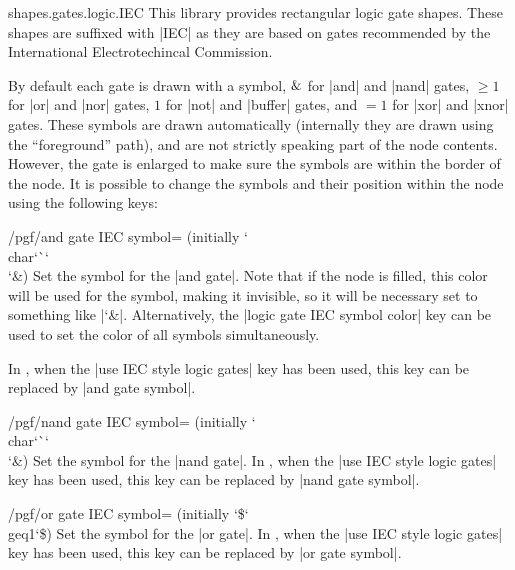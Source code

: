 \begin{pgflibrary}{shapes.gates.logic.IEC}
  This library provides rectangular logic gate shapes. These shapes
  are suffixed with |IEC| as they are based on gates recommended by
  the International Electrotechincal Commission.

  By default each gate is drawn with a symbol, $\char`\&$ for |and| and 
  |nand| gates, $\geq1$ for |or| and |nor| gates, $1$ for |not| and 
  |buffer| gates, and $=1$ for |xor| and |xnor| gates. These symbols 
  are drawn automatically (internally they are drawn using the 
  ``foreground'' path), and are not strictly speaking part of the node
  contents. However, the gate is enlarged to make sure the symbols are 
  within the border of the node.
  It is possible to change
  the symbols and their position within the node using the following
  keys:
  
\begin{key}{/pgf/and gate IEC symbol= (initially \char`\\char\char`\`\char`\\\char`\&)}
  Set the symbol for the |and gate|. Note that if the node is filled,
  this color will be used for the symbol, making it invisible, so
  it will be necessary set  to something like
  |\color{black}\char`\&|. Alternatively, the 
  |logic gate IEC symbol color| key can be used to set the color
  of all symbols simultaneously.
  
  In \tikzname, when the |use IEC style logic gates| key has been 
  used, this key can be replaced by |and gate symbol|.
\end{key}

\begin{key}{/pgf/nand gate IEC symbol= (initially \char`\\char\char`\`\char`\\\char`\&)}
  Set the symbol for the |nand gate|.  
  In \tikzname, when the |use IEC style logic gates| key has been 
  used, this key can be replaced by |nand gate symbol|.
\end{key}

\begin{key}{/pgf/or gate IEC symbol= (initially \char`\$\char`\\geq1\char`\$)}
  Set the symbol for the |or gate|.  
  In \tikzname, when the |use IEC style logic gates| key has been 
  used, this key can be replaced by |or gate symbol|.
\end{key}


\end{pgflibrary}
